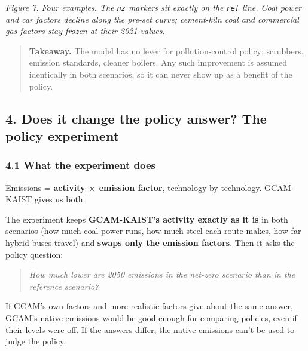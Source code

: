 
\emph{Figure
7. Four
examples.
The
\texttt{nz}
markers
sit
exactly on
the
\texttt{ref}
line. Coal
power and
car
factors
decline
along the
pre-set
curve;
cement-kiln
coal and
commercial
gas
factors
stay
frozen at
their 2021
values.}

\begin{quote}
\plainmark{}
\textbf{Takeaway.}
The model
has no
lever for
pollution-control
policy:
scrubbers,
emission
standards,
cleaner
boilers.
Any such
improvement
is assumed
identically
in both
scenarios,
so it can
never show
up as a
benefit of
the
policy.
\end{quote}

\hypertarget{does-it-change-the-policy-answer-the-policy-experiment}{%
\subsection*{4. Does it change the policy answer? The policy experiment}\label{does-it-change-the-policy-answer-the-policy-experiment}}

\hypertarget{what-the-experiment-does}{%
\subsubsection*{4.1 What the experiment does \plainmark{}}\label{what-the-experiment-does}}

Emissions
=
\textbf{activity
× emission
factor},
technology
by
technology.
GCAM-KAIST
gives us
both.

The
experiment
keeps
\textbf{GCAM-KAIST's
activity
exactly as
it is} in
both
scenarios
(how much
coal power
runs, how
much steel
each route
makes, how
far hybrid
buses
travel)
and
\textbf{swaps
only the
emission
factors}.
Then it
asks the
policy
question:

\begin{quote}
\emph{How
much lower
are 2050
emissions
in the
net-zero
scenario
than in
the
reference
scenario?}
\end{quote}

If GCAM's
own
factors
and more
realistic
factors
give about
the same
answer,
GCAM's
native
emissions
would be
good
enough for
comparing
policies,
even if
their
levels
were off.
If the
answers
differ,
the native
emissions
can't be
used to
judge the
policy.

